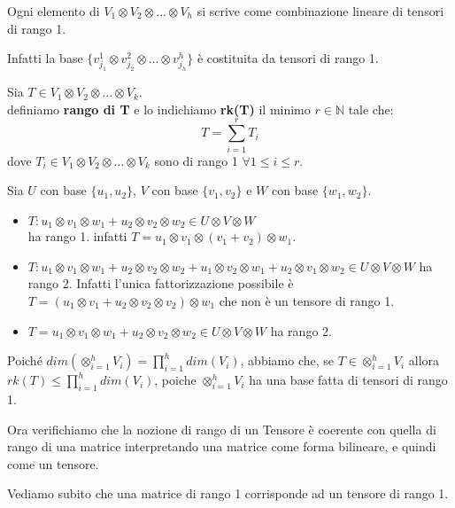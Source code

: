 \documentclass[../main.tex]{subfiles}
\begin{document}
Ogni elemento di $V_1 \otimes V_2 \otimes \ldots \otimes V_h$ si scrive come combinazione lineare di tensori di rango 1.

Infatti la base $\{v_{j_1}^1 \otimes v_{j_2}^2 \otimes \ldots \otimes v_{j_h}^h\}$ è costituita da tensori di rango 1.
\begin{definition}
    Sia $T \in V_1 \otimes V_2 \otimes \ldots \otimes V_k$.\\
    definiamo \textbf{rango di T} e lo indichiamo \textbf{rk(T)} il minimo $r \in \mathbb{N}$ tale che:
    \begin{equation*}
        T = \sum_{i=1}^{r}T_i
    \end{equation*}
    dove $T_i \in V_1 \otimes V_2 \otimes \ldots \otimes V_k$ sono di rango 1 $\forall 1 \leq i \leq r$.
\end{definition}

\begin{example}
    Sia $U$ con base $\{u_1, u_2\}$, $V$ con base $\{v_1, v_2\}$ e $W$ con base $\{w_1, w_2\}$.
    \begin{itemize}
        \item $T: u_1 \otimes v_1 \otimes w_1 + u_2 \otimes v_2 \otimes w_2  \in U \otimes V  \otimes W$\\
              ha rango 1. infatti $T = u_1 \otimes v_1 \otimes (v_1 + v_2 )\otimes w_1$.
        \item $T: u_1 \otimes v_1 \otimes w_1 + u_2 \otimes v_2 \otimes w_2 + u_1 \otimes v_2 \otimes w_1 + u_2 \otimes v_1 \otimes w_2 \in U \otimes V \otimes W$ ha rango 2.
              Infatti l'unica fattorizzazione possibile è $T = (u_1 \otimes v_1  + u_2 \otimes v_2 \otimes v_2) \otimes w_1$ che non è un tensore di rango 1.
        \item $T = u_1 \otimes v_1 \otimes w_1 + u_2 \otimes v_2 \otimes w_2 \in U \otimes V \otimes W $ ha rango 2.
    \end{itemize}
\end{example}

Poiché $dim(\otimes_{i=1}^{h} V_i) = \prod_{i=1}^{h} dim(V_i)$, abbiamo che, se $T \in \otimes_{i=1}^{h} V_i$ allora $rk(T) \leq \prod_{i=1}^{h} dim(V_i)$, poiche $\otimes_{i=1}^{h} V_i$ ha una base fatta di tensori di rango 1.

Ora verifichiamo che la nozione di rango di un Tensore è coerente con quella di rango di una matrice interpretando una matrice come forma bilineare, e quindi come un tensore.

Vediamo subito che una matrice di rango 1 corrisponde ad un tensore di rango 1.
\end{document}
